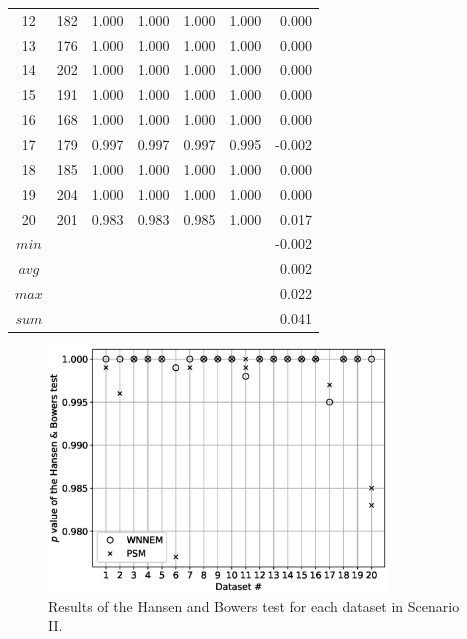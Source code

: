 \begin{table}[h]
\begin{tabular}{ccccccr}
				12      & 182     & 1.000     & 1.000     & 1.000     & 1.000 & 0.000      \\
				13      & 176     & 1.000     & 1.000     & 1.000     & 1.000 & 0.000      \\
				14      & 202     & 1.000     & 1.000     & 1.000     & 1.000 & 0.000      \\
				15      & 191     & 1.000     & 1.000     & 1.000     & 1.000 & 0.000      \\
				16      & 168     & 1.000     & 1.000     & 1.000     & 1.000 & 0.000      \\
				17      & 179     & 0.997     & 0.997     & 0.997     & 0.995 & -0.002     \\
				18      & 185     & 1.000     & 1.000     & 1.000     & 1.000 & 0.000      \\
				19      & 204     & 1.000     & 1.000     & 1.000     & 1.000 & 0.000      \\
				20      & 201     & 0.983     & 0.983     & 0.985     & 1.000 & 0.017      \\
				\midrule
				$min$   &         &           &           &           &       & -0.002     \\
				$avg$   &         &           &           &           &       & 0.002      \\
				$max$   &         &           &           &           &       & 0.022      \\
				$sum$   &         &           &           &           &       & 0.041      \\
				\bottomrule
			\end{tabular}
		\end{table}
								
								
		\begin{figure}[h]
			\centering
                \captionsetup{justification=centering}
			\includegraphics[width=0.8\textwidth]{assets/figures/control_group_selection/wnnem/scenII/hbp.eps}
			\caption{Results of the Hansen and Bowers test for each dataset in Scenario II.}
			\label{fig:wnnem_scen_II_hbp}    
		\end{figure}
								
